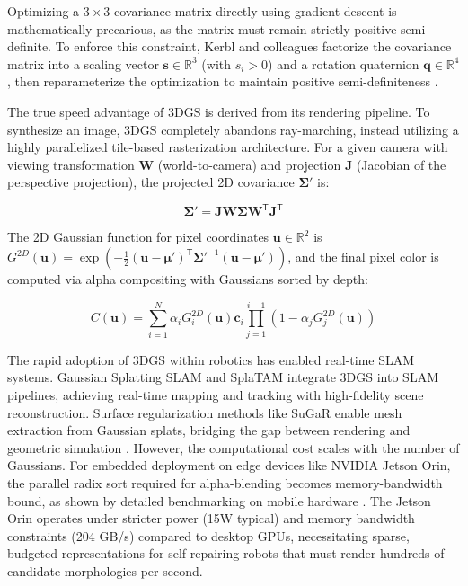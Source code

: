 \documentclass[12pt,a4paper,oneside]{report}
\begin{document}
Optimizing a $3 \times 3$ covariance matrix directly using gradient descent is mathematically precarious, as the matrix must remain strictly positive semi-definite. To enforce this constraint, Kerbl and colleagues factorize the covariance matrix into a scaling vector $\mathbf{s} \in \mathbb{R}^3$ (with $s_i > 0$) and a rotation quaternion $\mathbf{q} \in \mathbb{R}^4$, then reparameterize the optimization to maintain positive semi-definiteness \cite{kerbl20233d}.

The true speed advantage of 3DGS is derived from its rendering pipeline. To synthesize an image, 3DGS completely abandons ray-marching, instead utilizing a highly parallelized tile-based rasterization architecture. For a given camera with viewing transformation $\mathbf{W}$ (world-to-camera) and projection $\mathbf{J}$ (Jacobian of the perspective projection), the projected 2D covariance $\boldsymbol{\Sigma}'$ is:

\begin{equation}
\boldsymbol{\Sigma}' = \mathbf{J} \mathbf{W} \boldsymbol{\Sigma} \mathbf{W}^\mathsf{T} \mathbf{J}^\mathsf{T}
\end{equation}

The 2D Gaussian function for pixel coordinates $\mathbf{u} \in \mathbb{R}^2$ is $G^{2D}(\mathbf{u}) = \exp\left(-\frac{1}{2} (\mathbf{u} - \boldsymbol{\mu}')^\mathsf{T} \boldsymbol{\Sigma}'^{-1} (\mathbf{u} - \boldsymbol{\mu}')\right)$, and the final pixel color is computed via alpha compositing with Gaussians sorted by depth:

\begin{equation}
C(\mathbf{u}) = \sum_{i=1}^{N} \alpha_i G_i^{2D}(\mathbf{u}) \mathbf{c}_i \prod_{j=1}^{i-1} (1 - \alpha_j G_j^{2D}(\mathbf{u}))
\end{equation}

The rapid adoption of 3DGS within robotics has enabled real-time SLAM systems. Gaussian Splatting SLAM \cite{matsuki2024gaussian} and SplaTAM \cite{keetha2024splattam} integrate 3DGS into SLAM pipelines, achieving real-time mapping and tracking with high-fidelity scene reconstruction. Surface regularization methods like SuGaR enable mesh extraction from Gaussian splats, bridging the gap between rendering and geometric simulation \cite{guedon2024sugar}. However, the computational cost scales with the number of Gaussians. For embedded deployment on edge devices like NVIDIA Jetson Orin, the parallel radix sort required for alpha-blending becomes memory-bandwidth bound, as shown by detailed benchmarking on mobile hardware \cite{lassanske2024gaurast}. The Jetson Orin operates under stricter power (15W typical) and memory bandwidth constraints (204 GB/s) compared to desktop GPUs, necessitating sparse, budgeted representations for self-repairing robots that must render hundreds of candidate morphologies per second.
\end{document}
